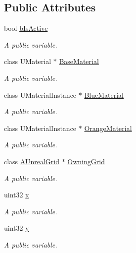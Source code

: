 \subsection*{Public Attributes}
\begin{DoxyCompactItemize}
\item 
bool \hyperlink{class_a_grid_block_a60c1ca6cb04e583147be45b85e3a1831}{b\+Is\+Active}
\begin{DoxyCompactList}\small\item\em A public variable. \end{DoxyCompactList}\item 
class U\+Material $\ast$ \hyperlink{class_a_grid_block_a30a0b537773f34ab41c2881f8e124f3a}{Base\+Material}
\begin{DoxyCompactList}\small\item\em A public variable. \end{DoxyCompactList}\item 
class U\+Material\+Instance $\ast$ \hyperlink{class_a_grid_block_a5687a984bdcb701c04af87d875c27e1f}{Blue\+Material}
\begin{DoxyCompactList}\small\item\em A public variable. \end{DoxyCompactList}\item 
class U\+Material\+Instance $\ast$ \hyperlink{class_a_grid_block_a4a396f418bffcef7a96b40e387cfd927}{Orange\+Material}
\begin{DoxyCompactList}\small\item\em A public variable. \end{DoxyCompactList}\item 
class \hyperlink{class_a_unreal_grid}{A\+Unreal\+Grid} $\ast$ \hyperlink{class_a_grid_block_af3dc096c5f96aba9b3b882f3f11deb93}{Owning\+Grid}
\begin{DoxyCompactList}\small\item\em A public variable. \end{DoxyCompactList}\item 
uint32 \hyperlink{class_a_grid_block_a8050ae31d3015e14fcae9d553977cea1}{x}
\begin{DoxyCompactList}\small\item\em A public variable. \end{DoxyCompactList}\item 
uint32 \hyperlink{class_a_grid_block_aad833bb2a47f65ef3cbba7940687c819}{y}
\begin{DoxyCompactList}\small\item\em A public variable. \end{DoxyCompactList}\end{DoxyCompactItemize}


